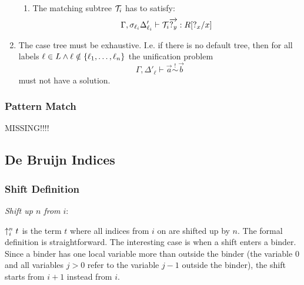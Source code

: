 \begin{enumerate}
\begin{enumerate}
            \item The matching subtree ${\mathcal T}_i$ has to satisfy:
                $$
                    \Gamma, \sigma_{\ell_i} \Delta'_{\ell_i}
                    \vdash
                    {\mathcal T}_i {\overrightarrow {{?_{y}}}}
                    :
                    R[{?_{x}} / x]
                $$

        \end{enumerate}


    \item The case tree must be exhaustive. I.e. if there is no default tree,
        then for all labels
        $
            \ell \in L
            \land
            \ell \notin {\{\ell_1, \ldots, \ell_n\}}
        $
        the unification problem
        $$
            \Gamma, \Delta'_\ell
            \vdash
            \vec a \stackrel ! \sim \vec b
        $$
        must not have a solution.
\end{enumerate}






\subsubsection{Pattern Match}


MISSING!!!!






\subsection{De Bruijn Indices}




\subsubsection{Shift Definition}

\emph{Shift up $n$ from $i$}:

$\uparrow^{n}_{i} t$ is the term $t$ where all indices from $i$ on are shifted up by
$n$. The formal definition is straightforward. The interesting case is when a
shift enters a binder. Since a binder has one local variable more than outside
the binder (the variable $0$ and all variables $j > 0$ refer to the variable $j
- 1$ outside the binder), the shift starts from $i + 1$ instead from $i$.


